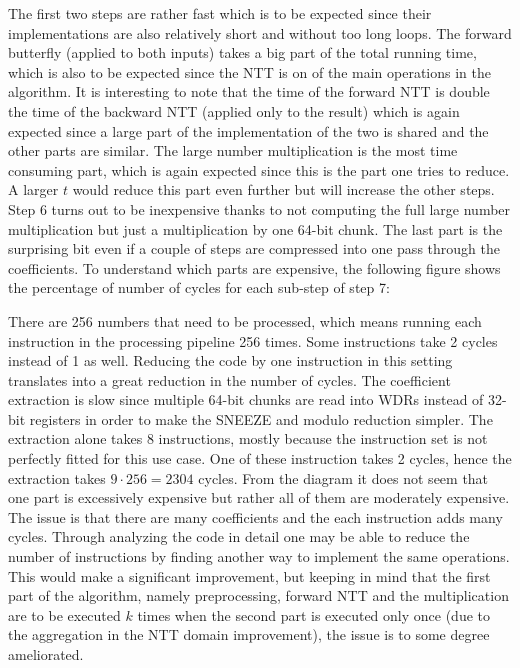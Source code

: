 The first two steps are rather fast which is to be expected since their implementations are also relatively short and without too long loops. The forward butterfly (applied to both inputs) takes a big part of the total running time, which is also to be expected since the NTT is on of the main operations in the algorithm. It is interesting to note that the time of the forward NTT is double the time of the backward NTT (applied only to the result) which is again expected since a large part of the implementation of the two is shared and the other parts are similar. The large number multiplication is the most time consuming part, which is again expected since this is the part one tries to reduce. A larger $t$ would reduce this part even further but will increase the other steps. Step 6 turns out to be inexpensive thanks to not computing the full large number multiplication but just a multiplication by one 64-bit chunk. The last part is the surprising bit even if a couple of steps are compressed into one pass through the coefficients. To understand which parts are expensive, the following figure shows the percentage of number of cycles for each sub-step of step 7:

\vspace{5mm}


There are 256 numbers that need to be processed, which means running each instruction in the processing pipeline 256 times. Some instructions take 2 cycles instead of 1 as well. Reducing the code by one instruction in this setting translates into a great reduction in the number of cycles. The coefficient extraction is slow since multiple 64-bit chunks are read into WDRs instead of 32-bit registers in order to make the SNEEZE and modulo reduction simpler. The extraction alone takes 8 instructions, mostly because the instruction set is not perfectly fitted for this use case. One of these instruction takes 2 cycles, hence the extraction takes $9 \cdot 256 = 2304$ cycles. From the diagram it does not seem that one part is excessively expensive but rather all of them are moderately expensive. The issue is that there are many coefficients and the each instruction adds many cycles. Through analyzing the code in detail one may be able to reduce the number of instructions by finding another way to implement the same operations. This would make a significant improvement, but keeping in mind that the first part of the algorithm, namely preprocessing, forward NTT and the multiplication are to be executed $k$ times when the second part is executed only once (due to the aggregation in the NTT domain improvement), the issue is to some degree ameliorated.

